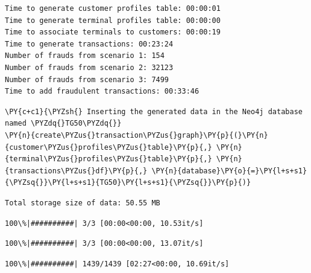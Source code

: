     \begin{Verbatim}[commandchars=\\\{\}]
Time to generate customer profiles table: 00:00:01
Time to generate terminal profiles table: 00:00:00
Time to associate terminals to customers: 00:00:19
Time to generate transactions: 00:23:24
Number of frauds from scenario 1: 154
Number of frauds from scenario 2: 32123
Number of frauds from scenario 3: 7499
Time to add fraudulent transactions: 00:33:46
    \end{Verbatim}

    \begin{tcolorbox}[breakable, size=fbox, boxrule=1pt, pad at break*=1mm,colback=cellbackground, colframe=cellborder]
\begin{Verbatim}[commandchars=\\\{\}]
\PY{c+c1}{\PYZsh{} Inserting the generated data in the Neo4j database named \PYZdq{}TG50\PYZdq{}}
\PY{n}{create\PYZus{}transaction\PYZus{}graph}\PY{p}{(}\PY{n}{customer\PYZus{}profiles\PYZus{}table}\PY{p}{,} \PY{n}{terminal\PYZus{}profiles\PYZus{}table}\PY{p}{,} \PY{n}{transactions\PYZus{}df}\PY{p}{,} \PY{n}{database}\PY{o}{=}\PY{l+s+s1}{\PYZsq{}}\PY{l+s+s1}{TG50}\PY{l+s+s1}{\PYZsq{}}\PY{p}{)}
\end{Verbatim}
\end{tcolorbox}

    \begin{Verbatim}[commandchars=\\\{\}]
Total storage size of data: 50.55 MB
    \end{Verbatim}

    
    \begin{Verbatim}[commandchars=\\\{\}]
  100\%|##########| 3/3 [00:00<00:00, 10.53it/s]
    \end{Verbatim}

    
    
    \begin{Verbatim}[commandchars=\\\{\}]
  100\%|##########| 3/3 [00:00<00:00, 13.07it/s]
    \end{Verbatim}

    
    
    \begin{Verbatim}[commandchars=\\\{\}]
  100\%|##########| 1439/1439 [02:27<00:00, 10.69it/s]
    \end{Verbatim}

